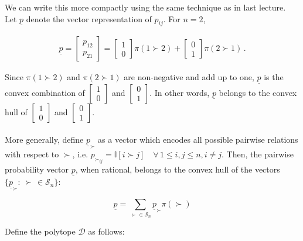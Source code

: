 \documentclass[11pt]{article}
\begin{document}
We can write this more compactly using the same technique as in last lecture. Let $\underline{p}$ denote the vector representation of $p_{ij}$. For $n = 2$, 

\begin{align*}
\underline{p} = \begin{bmatrix}
p_{12} \\
p_{21}
\end{bmatrix}= 
\begin{bmatrix}
1 \\
0
\end{bmatrix}
\pi(1 \succ 2) + 
\begin{bmatrix}
0 \\
1
\end{bmatrix}
\pi(2 \succ 1) \, .
\end{align*}

Since $\pi(1 \succ 2)$ and $\pi(2 \succ 1)$ are non-negative and add up to one, $\underline{p} $ is the convex combination of 
$\begin{bmatrix}
	1 \\
	0
\end{bmatrix}$
and 
$\begin{bmatrix}
0 \\
1
\end{bmatrix}$. In other words,  $\underline{p} $ belongs to the convex hull of 
$\begin{bmatrix}
1 \\
0
\end{bmatrix}$ and
$\begin{bmatrix}
0 \\
1
\end{bmatrix}$.
\\~\\

More generally, define $\underline{p}_{\succ}$ as a vector which encodes all possible pairwise relations with respect to $\succ$, i.e. $p_{{\succ}_{ij}} = \mathbb{I}[i \succ j] \quad \forall \, 1 \leq i,j\leq n, i \neq j$. Then, the pairwise probability vector $\underline{p}$, when rational, belongs to the convex hull of the vectors $\{\underline{p}_{\succ} : \, \succ \, \in \mathcal{S}_n\}$:

\begin{equation*}
\underline{p} = \sum_{\succ \in \mathcal{S}_n} \underline{p}_{\succ} \pi(\succ)
\end{equation*}

Define the polytope $\mathcal{D}$ as follows:
\end{document}
